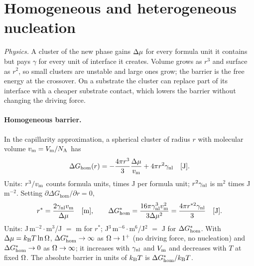 \section{Homogeneous and heterogeneous nucleation}\label{th:sec:nucleation}

\textit{Physics.} A cluster of the new phase gains $\Delta\mu$ for every formula unit it contains but
pays $\gamma$ for every unit of interface it creates. Volume grows as $r^{3}$ and surface as
$r^{2}$, so small clusters are unstable and large ones grow; the barrier is the free energy at the
crossover. On a substrate the cluster can replace part of its interface with a cheaper
substrate contact, which lowers the barrier without changing the driving force.

\paragraph{Homogeneous barrier.} In the capillarity approximation, a spherical cluster of radius
$r$ with molecular volume $v_\mathrm{m}=V_\mathrm{m}/N_\mathrm{A}$ has
\begin{equation}\label{th:eq:dg-r}
\Delta G_\mathrm{hom}(r)=-\frac{4\pi r^{3}}{3}\frac{\Delta\mu}{v_\mathrm{m}}+4\pi r^{2}\gamma_\mathrm{nl} \quad[\mathrm{J}].
\end{equation}
Units: $r^{3}/v_\mathrm{m}$ counts formula units, times J per formula unit; $r^{2}\gamma_\mathrm{nl}$ is m$^2$ times
J\,m$^{-2}$. Setting $\partial\Delta G_\mathrm{hom}/\partial r=0$,
\begin{equation}\label{th:eq:hom}
r^{*}=\frac{2\gamma_\mathrm{nl}v_\mathrm{m}}{\Delta\mu} \quad[\mathrm{m}],\qquad
\Delta G^{*}_\mathrm{hom}=\frac{16\pi\gamma_\mathrm{nl}^{3}v_\mathrm{m}^{2}}{3\Delta\mu^{2}}=\frac{4\pi r^{*2}\gamma_\mathrm{nl}}{3} \quad[\mathrm{J}].
\end{equation}
Units: J\,m$^{-2}\cdot$m$^{3}$/J $=$ m for $r^{*}$; J$^{3}$\,m$^{-6}\cdot$m$^{6}$/J$^{2}$ $=$ J for
$\Delta G^{*}_\mathrm{hom}$. With $\Delta\mu=k_\mathrm{B} T\ln\Omega$, $\Delta G^{*}_\mathrm{hom}\to\infty$ as $\Omega\to1^{+}$ (no driving force, no
nucleation) and $\Delta G^{*}_\mathrm{hom}\to0$ as $\Omega\to\infty$; it increases with $\gamma_\mathrm{nl}$ and $V_\mathrm{m}$ and decreases
with $T$ at fixed $\Omega$. The absolute barrier in units of $k_\mathrm{B} T$ is $\Delta G^{*}_\mathrm{hom}/k_\mathrm{B} T$.

